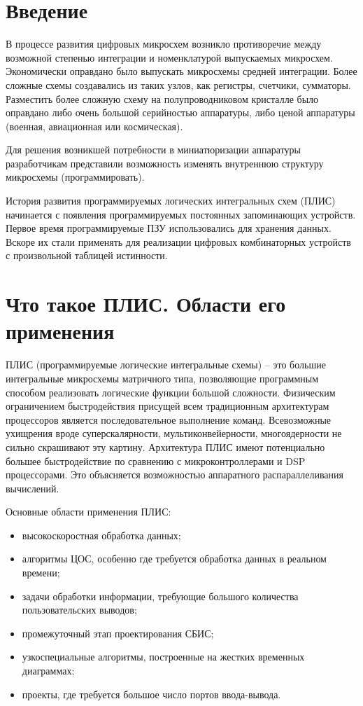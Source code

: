\section*{Введение}

В процессе развития цифровых микросхем возникло противоречие между возможной
степенью интеграции и номенклатурой выпускаемых микросхем. Экономически
оправдано было выпускать микросхемы средней интеграции. Более сложные схемы
создавались из таких узлов, как регистры, счетчики, сумматоры. Разместить более
сложную схему на полупроводниковом кристалле было оправдано либо очень большой
серийностью аппаратуры, либо ценой аппаратуры (военная, авиационная или
космическая).

Для решения возникшей потребности в миниатюризации аппаратуры разработчикам
представили возможность изменять внутреннюю структуру микросхемы
(программировать).

История развития программируемых логических интегральных схем (ПЛИС) начинается
с появления программируемых постоянных запоминающих устройств. Первое время
программируемые ПЗУ использовались для хранения данных. Вскоре их стали
применять для реализации цифровых комбинаторных устройств с произвольной
таблицей истинности.  

\vspace*{2em} %

\section{Что такое ПЛИС. Области его применения}

ПЛИС (программируемые логические интегральные схемы) -- это большие
интегральные микросхемы матричного типа, позволяющие программным способом
реализовать логические функции большой сложности. Физическим ограничением
быстродействия присущей всем традиционным архитектурам процессоров является
последовательное выполнение команд. Всевозможные ухищрения вроде
суперскалярности, мультиконвейерности, многоядерности не сильно скрашивают эту
картину. Архитектура ПЛИС имеют потенциально большее быстродействие по
сравнению с микроконтроллерами и DSP процессорами. Это объясняется возможностью
аппаратного распараллеливания вычислений.

Основные области применения ПЛИС:
\begin{itemize}
    \item высокоскоростная обработка данных;
    \item алгоритмы ЦОС, особенно где требуется обработка данных в реальном
    времени;
    \item задачи обработки информации, требующие большого количества
    пользовательских выводов;
    \item промежуточный этап проектирования СБИС;
    \item узкоспециальные алгоритмы, построенные на жестких временных
    диаграммах;
    \item проекты, где требуется большое число портов ввода-вывода.
\end{itemize}

